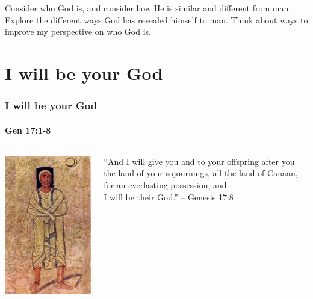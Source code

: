 \begin{goals}
\goal Consider who God is, and consider how He is similar and different from man.
\goal Explore the different ways God has revealed himself to man.
\goal Think about ways to improve my perspective on who God is.

\end{goals}

\section{I will be your God}

\begin{frame}
\frametitle{I will be your God}
\framesubtitle{Gen 17:1-8}
\begin{columns}[T]
	\begin{column}{0.4\textwidth}
		\includegraphics[height=0.8\textheight]{figures/abrahamDuraEuropos.jpg}
	\end{column}
	\begin{column}{0.6\textwidth}
		``And I will give you and to your offspring after you the land of your sojournings, all the land of Canaan, for an everlasting possession, and \\\alert{I will be their God}.'' -- Genesis 17:8
	\end{column}
\end{columns}


\end{frame}
